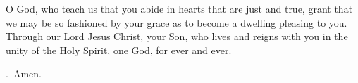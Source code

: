 \lettrine[lines=3]{O}{} God, who teach us that you abide
in hearts that are just and true,
grant that we may be so fashioned by your grace
as to become a dwelling pleasing to you.
Through our Lord Jesus Christ, your Son,
who lives and reigns with you in the unity of the Holy Spirit,
one God, for ever and ever. \par \Rbar.~Amen.
